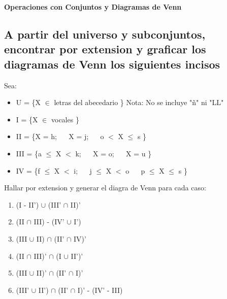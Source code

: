 \documentclass{article}%
\begin{document}
\begin{Large}
\begin{center}
\textbf{Operaciones con Conjuntos y Diagramas de Venn} \\
\end{center}
\end{Large}

\vspace{0.2in}

\begin{small}
    \section*{A partir del universo y subconjuntos, encontrar por extension y graficar los diagramas de Venn los siguientes incisos} \textit{}
\end{small}

\vspace{0.2in}

Sea: 

\begin{itemize}
    \item U = \{X $\in$ letras del abecedario \} \hspace{0.20in} Nota: No se incluye "ñ" ni "LL"
    \item I = \{X $\in$ vocales \}
    \item II = \{X = h; $\quad$ X = j; $\quad$ o $<$ X $\leq$ s  \}
    \item III = \{a $\leq$ X $<$ k; $\quad$  X = o; $\quad$ X = u  \}
     \item IV = \{f $\leq$ X $<$ i; $\quad$ j $\leq$ X $<$ o $\quad$  p $\leq$ X $\leq$ s \}
\end{itemize}

\vspace{0.10in}

Hallar por extension y generar el diagra de Venn para cada caso:

\begin{enumerate}[label=\alph*)]
    \item (I - II') $\cup$ (III' $\cap$ II)'     \label{a}
    \item (II $\cap$ III) - (IV' $\cup$ I')         \label{b}
    \item (III $\cup$ II) $\cap$ (II' $\cap$ IV)'   \label{c}
    \item (II $\cap$ III)' $\cap$ (I $\cup$ II')'   \label{d}
    \item (III $\cup$ II)' $\cap$ (II' $\cap$ I)'    \label{e}
    \item (III' $\cup$ II') $\cap$ (II' $\cap$ I)' - (IV' - III)   \label{f}
\end{enumerate}
\end{document}
